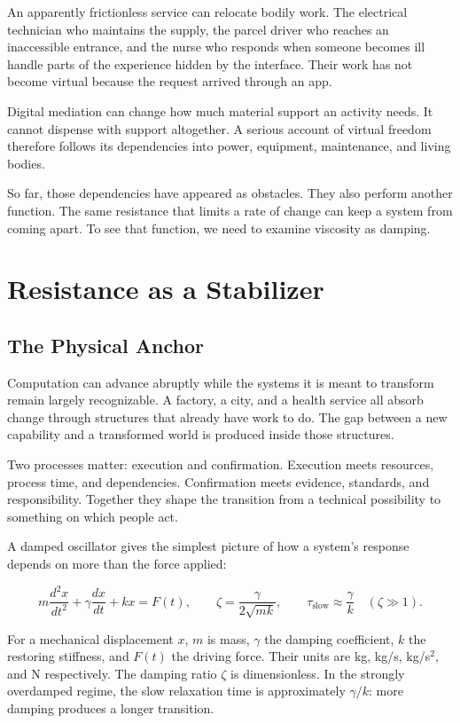 \documentclass[11pt,openany]{book}
\begin{document}
An apparently frictionless service can relocate bodily work. The electrical technician who maintains the supply, the parcel driver who reaches an inaccessible entrance, and the nurse who responds when someone becomes ill handle parts of the experience hidden by the interface. Their work has not become virtual because the request arrived through an app.

Digital mediation can change how much material support an activity needs. It cannot dispense with support altogether. A serious account of virtual freedom therefore follows its dependencies into power, equipment, maintenance, and living bodies.

So far, those dependencies have appeared as obstacles. They also perform another function. The same resistance that limits a rate of change can keep a system from coming apart. To see that function, we need to examine viscosity as damping.

\section{Resistance as a Stabilizer}

\subsection{The Physical Anchor}

Computation can advance abruptly while the systems it is meant to transform remain largely recognizable. A factory, a city, and a health service all absorb change through structures that already have work to do. The gap between a new capability and a transformed world is produced inside those structures.

Two processes matter: execution and confirmation. Execution meets resources, process time, and dependencies. Confirmation meets evidence, standards, and responsibility. Together they shape the transition from a technical possibility to something on which people act.

A damped oscillator gives the simplest picture of how a system's response depends on more than the force applied:

\begin{equation}
m\frac{d^2x}{dt^2}+\gamma\frac{dx}{dt}+kx=F(t),
\qquad
\zeta=\frac{\gamma}{2\sqrt{mk}},
\qquad
\tau_{\mathrm{slow}}\approx\frac{\gamma}{k}\quad(\zeta\gg1).
\end{equation}

For a mechanical displacement $x$, $m$ is mass, $\gamma$ the damping coefficient, $k$ the restoring stiffness, and $F(t)$ the driving force. Their units are kg, kg/s, kg/s$^2$, and N respectively. The damping ratio $\zeta$ is dimensionless. In the strongly overdamped regime, the slow relaxation time is approximately $\gamma/k$: more damping produces a longer transition.
\end{document}
